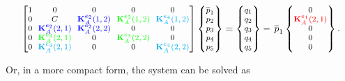 \documentclass[12pt]{article}
\begin{document}
\begin{itemize}
	\begin{equation} \label{eq:global_mobility_matrix_BC2}
		\footnotesize
		\setlength{\arraycolsep}{3pt}
		\begin{bmatrix}
			1 & 0 & 0 & 0 & 0 \\
			0  & C & \textcolor{blue}{\mathbf{K}_{A}^{e_2}(1,2)} & \textcolor{green}{\mathbf{K}_{A}^{e_3}(1,2)} & \textcolor{cyan}{\mathbf{K}_{A}^{e_4}(1,2)} \\
			0   &   \textcolor{blue}{\mathbf{K}_{A}^{e_2}(2,1)}   &   \textcolor{blue}{\mathbf{K}_{A}^{e_2}(2,2)}   & 0 & 0 \\
			0   &   \textcolor{green}{\mathbf{K}_{A}^{e_3}(2,1)}   &   0   &  \textcolor{green}{\mathbf{K}_{A}^{e_3}(2,2)}  &   0 \\
			0   &   \textcolor{cyan}{\mathbf{K}_{A}^{e_4}(2,1)}   &   0   &   0   &   \textcolor{cyan}{\mathbf{K}_{A}^{e_4}(2,2)}
		\end{bmatrix}
		\begin{Bmatrix}
			\overline{p}_1 \\
			p_2 \\
			p_3 \\
			p_4 \\
			p_5 \\
		\end{Bmatrix}
		=
		\begin{Bmatrix}
			q_1 \\
			q_2 \\
			q_3 \\
			q_4 \\
			q_5 \\
		\end{Bmatrix}
		- \, \overline{p}_1 
		\begin{Bmatrix}
			0 \\
			\textcolor{red}{\mathbf{K}_{A}^{e_1}(2,1)} \\
			0 \\
			0 \\
			0 \\
		\end{Bmatrix}.
	\end{equation}
	
	\noindent Or, in a more compact form, the system can be solved as
	

\end{itemize}
\end{document}
